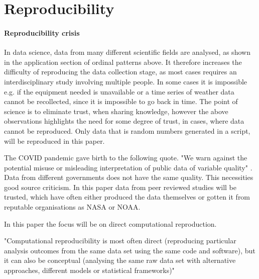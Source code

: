 \section{Reproducibility}
\paragraph{Reproducibility crisis}
In data science, data from many different scientific fields are analysed, as shown in the application section of ordinal patterns above. It therefore increases the difficulty of reproducing the data collection stage, as most cases requires an interdisciplinary study involving multiple people. In some cases it is impossible e.g. if the equipment needed is unavailable or a time series of weather data cannot be recollected, since it is impossible to go back in time. The point of science is to eliminate trust, when sharing knowledge, however the above observations highlights the need for some degree of trust, in cases, where data cannot be reproduced. Only data that is random numbers generated in a script, will be reproduced in this paper.

The COVID pandemic gave birth to the following quote. "We warn against the potential misuse or misleading interpretation of public data of variable quality" \cite{Struelens2021}. Data from different governments does not have the same quality. This necessities good source criticism. In this paper data from peer reviewed studies will be trusted, which have often either produced the data themselves or gotten it from reputable organisations as NASA or NOAA. 

In this paper the focus will be on direct computational reproduction.

"Computational reproducibility is most often direct (reproducing particular analysis outcomes from the same data set using the same code and software), but it can also be conceptual (analysing the same raw data set with alternative approaches, different models or statistical frameworks)" \cite{Fidler2018}


